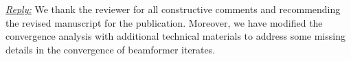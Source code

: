 
\vspace{1eM}
\underline{\textit{Reply:}} We thank the reviewer for all constructive comments and recommending the revised manuscript for the publication. Moreover, we have modified the convergence analysis with additional technical materials to address some missing details in the convergence of beamformer iterates.